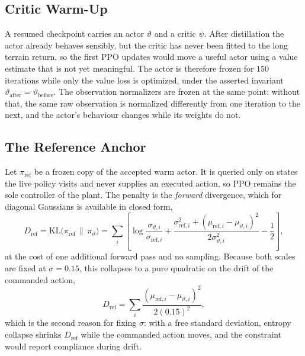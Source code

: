 \subsection{Critic Warm-Up}

A resumed checkpoint carries an actor $\vartheta$ and a critic $\psi$. After
distillation the actor already behaves sensibly, but the critic has never been
fitted to the long terrain return, so the first PPO updates would move a useful
actor using a value estimate that is not yet meaningful. The actor is therefore
frozen for $150$ iterations while only the value loss is optimized, under the
asserted invariant $\vartheta_{\text{after}} = \vartheta_{\text{before}}$. The
observation normalizers are frozen at the same point: without that, the same
raw observation is normalized differently from one iteration to the next, and
the actor's behaviour changes while its weights do not.

\subsection{The Reference Anchor}

Let $\pi_{\mathrm{ref}}$ be a frozen copy of the accepted warm actor. It is
queried only on states the live policy visits and never supplies an executed
action, so PPO remains the sole controller of the plant. The penalty is the
\emph{forward} divergence, which for diagonal Gaussians is available in closed
form,
%
\begin{equation}
  \label{eq:ctrl:kl}
  D_{\mathrm{ref}}
  = \mathrm{KL}\bigl(\pi_{\mathrm{ref}} \,\|\, \pi_\vartheta\bigr)
  = \sum_i \left[
    \log\frac{\sigma_{\vartheta,i}}{\sigma_{\mathrm{ref},i}}
    + \frac{\sigma_{\mathrm{ref},i}^{2}
      + (\mu_{\mathrm{ref},i}-\mu_{\vartheta,i})^{2}}
      {2\sigma_{\vartheta,i}^{2}}
    - \frac{1}{2}\right],
\end{equation}
%
at the cost of one additional forward pass and no sampling. Because both scales
are fixed at $\sigma = 0.15$, this collapses to a pure quadratic on the drift of
the commanded action,
%
\begin{equation}
  \label{eq:ctrl:kl-fixed}
  D_{\mathrm{ref}}
  = \sum_i \frac{(\mu_{\mathrm{ref},i}-\mu_{\vartheta,i})^{2}}{2(0.15)^{2}},
\end{equation}
%
which is the second reason for fixing $\sigma$: with a free standard deviation,
entropy collapse shrinks $D_{\mathrm{ref}}$ while the commanded action moves,
and the constraint would report compliance during drift.

